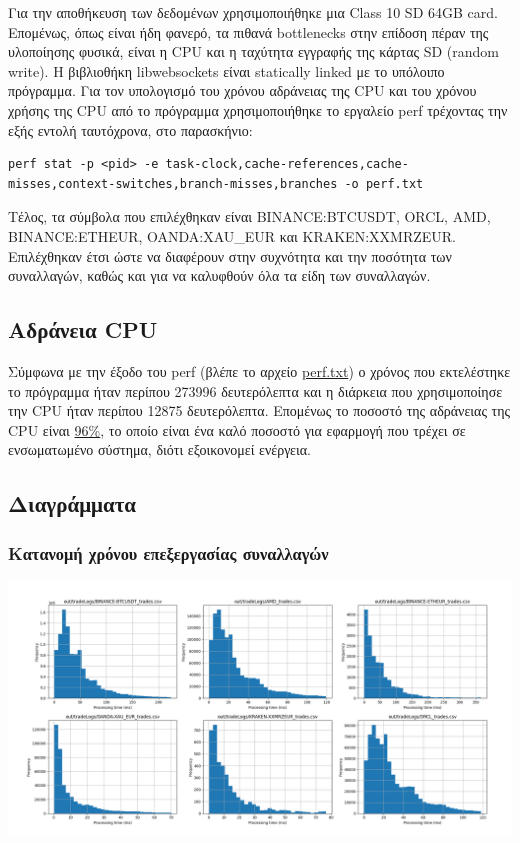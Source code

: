 \documentclass[11pt]{article}
\begin{document}
Για την αποθήκευση των δεδομένων χρησιμοποιήθηκε μια Class 10 SD 64GB card. Επομένως, όπως είναι ήδη φανερό, τα πιθανά bottlenecks στην επίδοση πέραν της υλοποίησης φυσικά, είναι η CPU και η ταχύτητα εγγραφής της κάρτας SD (random write). Η βιβλιοθήκη libwebsockets είναι statically linked με το υπόλοιπο πρόγραμμα. Για τον υπολογισμό του χρόνου αδράνειας της CPU και του χρόνου χρήσης της CPU από το πρόγραμμα χρησιμοποιήθηκε το εργαλείο perf\autocite{sites:perf-wiki} τρέχοντας την εξής εντολή ταυτόχρονα, στο παρασκήνιο:

\begin{verbatim}
perf stat -p <pid> -e task-clock,cache-references,cache-misses,context-switches,branch-misses,branches -o perf.txt
\end{verbatim}
Τέλος, τα σύμβολα που επιλέχθηκαν είναι BINANCE:BTCUSDT, ORCL, AMD, BINANCE:ETHEUR, OANDA:XAU\_EUR και KRAKEN:XXMRZEUR. Επιλέχθηκαν έτσι ώστε να διαφέρουν στην συχνότητα και την ποσότητα των συναλλαγών, καθώς και για να καλυφθούν όλα τα είδη των συναλλαγών.

\pagebreak
\subsection{Αδράνεια CPU}
\label{sec:org13f09cd}
Σύμφωνα με την έξοδο του perf (βλέπε το αρχείο \href{https://github.com/thetonk/tradestats/blob/main/report/perf.txt}{perf.txt}) ο χρόνος που εκτελέστηκε το πρόγραμμα ήταν περίπου 273996 δευτερόλεπτα και η διάρκεια που χρησιμοποίησε την CPU ήταν περίπου 12875 δευτερόλεπτα. Επομένως το ποσοστό της αδράνειας της CPU είναι \uline{96\%}, το οποίο είναι ένα καλό ποσοστό για εφαρμογή που τρέχει σε ενσωματωμένο σύστημα, διότι εξοικονομεί ενέργεια.
\subsection{Διαγράμματα}
\label{sec:orge001637}
\subsubsection{Κατανομή χρόνου επεξεργασίας συναλλαγών}
\label{sec:org73788f0}
\begin{center}
\includegraphics[width=\linewidth]{./images/histogram-per-symbol.png}
\end{center}
\end{document}
